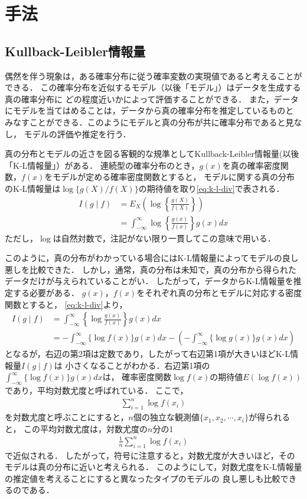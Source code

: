 \section{手法}
\subsection{Kullback-Leibler情報量}
偶然を伴う現象は，ある確率分布に従う確率変数の実現値であると考えることができる．
この確率分布を近似するモデル（以後「モデル」）はデータを生成する真の確率分布に
どの程度近いかによって評価することができる．
また，データにモデルを当てはめることは，データから真の確率分布を推定しているものと
みなすことができる．このようにモデルと真の分布が共に確率分布であると見なし，
モデルの評価や推定を行う．

真の分布とモデルの近さを図る客観的な規準としてKullback-Leibler情報量(以後「K-L情報量」）がある．
連続型の確率分布のとき，$g(x)$を真の確率密度関数，$f(x)$をモデルが定める確率密度関数とすると，
モデルに関する真の分布のK-L情報量は$\log\{g(X)/f(X)\}$の期待値を取り\eqref{eq:k-l-div}で表される．
\begin{align}
  \label{eq:k-l-div}
  I(g \mid f) &= E_X\left(\log \left\{\frac{g(X)}{f(X)}\right\}\right)\\\nonumber
              &= \int^{\infty}_{-\infty}\log\left\{\frac{g(x)}{f(x)}\right\}g(x)dx
\end{align}
ただし，$\log$は自然対数で，注記がない限り一貫してこの意味で用いる．

このように，真の分布がわかっている場合にはK-L情報量によってモデルの良し悪しを比較できた．
しかし，通常，真の分布は未知で，真の分布から得られたデータだけが与えられていることがい．
したがって，データからK-L情報量を推定する必要がある．
$g(x)$，$f(x)$をそれぞれ真の分布とモデルに対応する密度関数とすると，
\eqref{eq:k-l-div}より，
\begin{align*}
  I(g \mid f) &= \int^{\infty}_{-\infty}\left\{\log\frac{g(x)}{f(x)}\right\}g(x)dx\\\nonumber
              &= -\int^{\infty}_{-\infty}\{\log f(x)\}g(x)dx - 
                 \left(-\int^{\infty}_{-\infty}\{\log g(x)\}g(x)dx\right)
\end{align*}
となるが，右辺の第2項は定数であり，したがって右辺第1項が大きいほどK-L情報量$I(g \mid f)$は
小さくなることがわかる．右辺第1項の$\int^{\infty}_{-\infty}\{\log f(x)\}g(x)dx$は，
確率密度関数$\log f(x)$の期待値$E( \log f(x))$であり，平均対数尤度と呼ばれている．
ここで，
\begin{align*}
  \sum_{i=1}^{n}\log f(x_i)
\end{align*}
を対数尤度と呼ぶことにすると，$n$個の独立な観測値$\{x_1, x_2, \cdots, x_i\}$が得られると，
この平均対数尤度は，対数尤度の$n$分の1
\begin{align*}
  \frac{1}{n}\sum_{i=1}^{n}\log f(x_i)
\end{align*}
で近似される．
したがって，符号に注意すると，対数尤度が大きいほど，そのモデルは真の分布に近いと考えられる．
このようにして，対数尤度をK-L情報量の推定値を考えることにすると異なったタイプのモデルの
良し悪しも比較できるのである．

